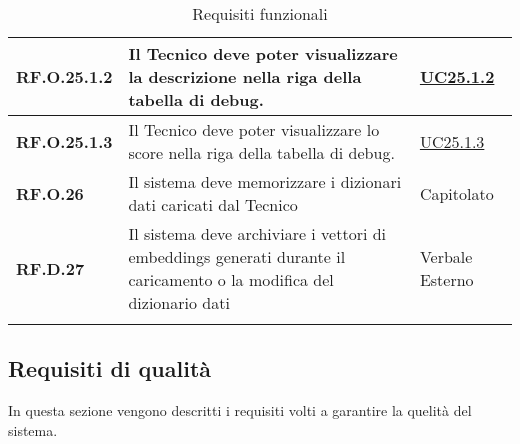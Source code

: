 \begin{longtable}{|P{3cm}|P{6,5cm}|>{\arraybackslash}P{4cm}|}
    \textbf{RF.O.25.1.2} & Il Tecnico deve poter visualizzare la descrizione nella riga della tabella di debug. &  \hyperref[UC25poin1point2]{UC25.1.2}\\
    \hline
    \textbf{RF.O.25.1.3} & Il Tecnico deve poter visualizzare lo score nella riga della tabella di debug. &  \hyperref[UC25poin1point3]{UC25.1.3}\\
    \hline
    \textbf{RF.O.26} & Il sistema deve memorizzare i dizionari dati caricati dal Tecnico & Capitolato\\
    \hline
    \textbf{RF.D.27} & Il sistema deve archiviare i vettori di embeddings generati durante il caricamento o la modifica del dizionario dati & Verbale Esterno\\
    \hline

\caption{Requisiti funzionali}
\label{requisitifunzionali}
\end{longtable}

\subsection{Requisiti di qualità}
In questa sezione vengono descritti i requisiti volti a garantire la quelità del sistema.

